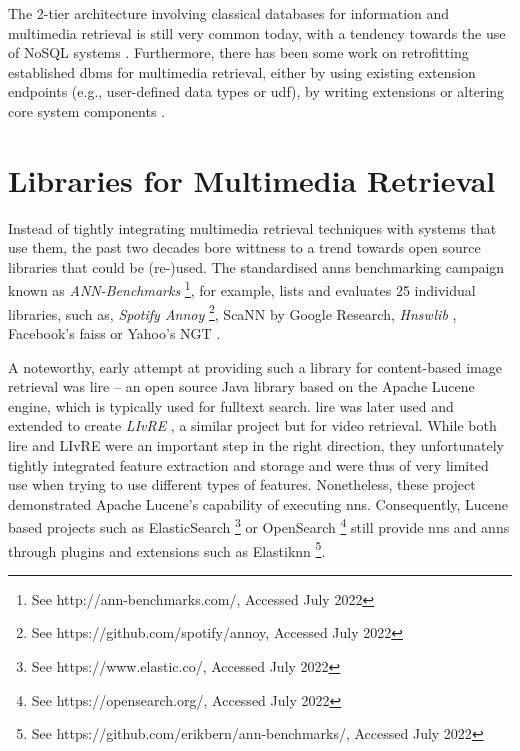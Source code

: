 The 2-tier architecture involving classical databases for information and multimedia retrieval is still very common today, with a tendency towards the use of NoSQL systems \cite{Muhleisen:2014Old,Oliveira:2017Performance}. Furthermore, there has been some work on retrofitting established \acrshort{dbms} for multimedia retrieval, either by using existing extension endpoints (e.g., user-defined data types or \acrfull{udf}), by writing extensions or altering core system components \cite{Guliato:2009PostgreSQL,Whang:2010Tightly,Giangreco:2014Adam,Fleites:2013Efficient,Whang:2015DB,Yang:2020Pase}.

\section{Libraries for Multimedia Retrieval}
\label{section:nns_libraries}

Instead of tightly integrating multimedia retrieval techniques with systems that use them, the past two decades bore wittness to a trend towards open source libraries that could be (re-)used. The standardised \acrshort{anns} benchmarking campaign known as \emph{ANN-Benchmarks} \cite{Aumueller:2017ANN} \footnote{See http://ann-benchmarks.com/, Accessed July 2022}, for example, lists and evaluates 25 individual libraries, such as, \emph{Spotify Annoy} \footnote{See https://github.com/spotify/annoy, Accessed July 2022}, ScaNN \cite{Guo:2020Accelerating} by Google Research, \emph{Hnswlib} \cite{Malkov:2018Efficient}, Facebook's \acrshort{faiss} \cite{Johnson:2019Billion} or Yahoo's NGT \cite{Iwasaki2016:Pruned}.

A noteworthy, early attempt at providing such a library for content-based image retrieval was \acrfull{lire} \cite{Luc:2008LIRE} -- an open source Java library based on the Apache Lucene engine, which is typically used for fulltext search. \acrshort{lire} was later used and extended to create \emph{LIvRE} \cite{Oliveira:2016Large}, a similar project but for video retrieval. While both \acrshort{lire} and LIvRE were an important step in the right direction, they unfortunately tightly integrated feature extraction and storage and were thus of very limited use when trying to use different types of features. Nonetheless, these project demonstrated Apache Lucene's capability of executing \acrshort{nns}. Consequently, Lucene based projects such as ElasticSearch \footnote{See https://www.elastic.co/, Accessed July 2022} or OpenSearch \footnote{See https://opensearch.org/, Accessed July 2022} still provide \acrshort{nns} and \acrshort{anns} through plugins and extensions such as Elastiknn \footnote{See https://github.com/erikbern/ann-benchmarks/, Accessed July 2022}.


